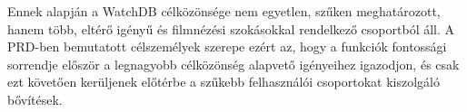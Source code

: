 Ennek alapján a WatchDB célközönsége nem egyetlen, szűken meghatározott, hanem több, eltérő igényű és filmnézési szokásokkal rendelkező csoportból áll. A PRD-ben bemutatott célszemélyek szerepe ezért az, hogy a funkciók fontossági sorrendje először a legnagyobb célközönség alapvető igényeihez igazodjon, és csak ezt követően kerüljenek előtérbe a szűkebb felhasználói csoportokat kiszolgáló bővítések.
